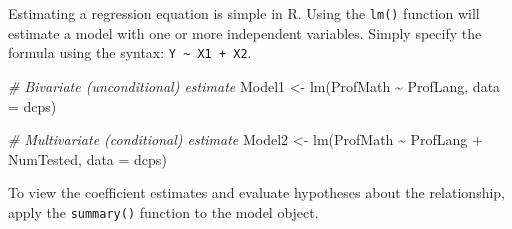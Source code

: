 \documentclass[
  12pt,
]{krantz}
\newenvironment{Shaded}{\begin{snugshade}}{\end{snugshade}}
\newcommand{\AttributeTok}[1]{\textcolor[rgb]{0.77,0.63,0.00}{#1}}
\newcommand{\CommentTok}[1]{\textcolor[rgb]{0.56,0.35,0.01}{\textit{#1}}}
\newcommand{\FunctionTok}[1]{\textcolor[rgb]{0.00,0.00,0.00}{#1}}
\newcommand{\NormalTok}[1]{#1}
\newcommand{\OtherTok}[1]{\textcolor[rgb]{0.56,0.35,0.01}{#1}}
\newcommand{\SpecialCharTok}[1]{\textcolor[rgb]{0.00,0.00,0.00}{#1}}
\begin{document}
Estimating a regression equation is simple in R. Using the \texttt{lm()} function will estimate a model with one or more independent variables. Simply specify the formula using the syntax: \texttt{Y\ \textasciitilde{}\ X1\ +\ X2}.

\begin{Shaded}
\begin{Highlighting}[]
\CommentTok{\# Bivariate (unconditional) estimate}
\NormalTok{  Model1 }\OtherTok{\textless{}{-}} \FunctionTok{lm}\NormalTok{(ProfMath }\SpecialCharTok{\textasciitilde{}}\NormalTok{ ProfLang, }\AttributeTok{data =}\NormalTok{ dcps)}

\CommentTok{\# Multivariate (conditional) estimate}
\NormalTok{  Model2 }\OtherTok{\textless{}{-}} \FunctionTok{lm}\NormalTok{(ProfMath }\SpecialCharTok{\textasciitilde{}}\NormalTok{ ProfLang }\SpecialCharTok{+}\NormalTok{ NumTested, }\AttributeTok{data =}\NormalTok{ dcps)}
\end{Highlighting}
\end{Shaded}

To view the coefficient estimates and evaluate hypotheses about the relationship, apply the \texttt{summary()} function to the model object.
\end{document}
